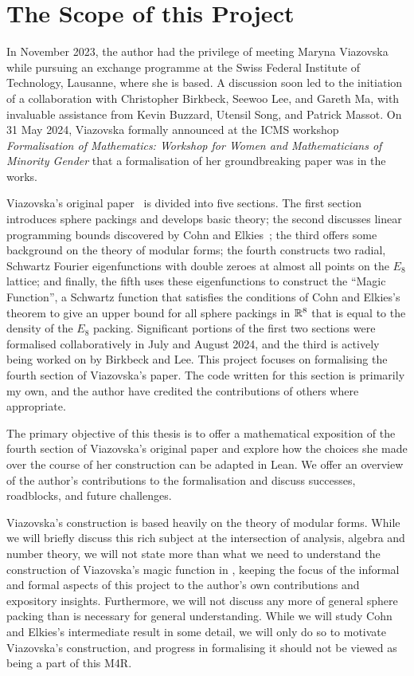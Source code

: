 \section{The Scope of this Project}


In November 2023, the author had the privilege of meeting Maryna Viazovska while pursuing an exchange programme at the Swiss Federal Institute of Technology, Lausanne, where she is based. A discussion soon led to the initiation of a collaboration with Christopher Birkbeck, Seewoo Lee, and Gareth Ma, with invaluable assistance from Kevin Buzzard, Utensil Song, and Patrick Massot. On 31 May 2024, Viazovska formally announced at the ICMS workshop \textit{Formalisation of Mathematics: Workshop for Women and Mathematicians of Minority Gender} that a formalisation of her groundbreaking paper was in the works.

Viazovska's original paper~\cite{Viazovska8} is divided into five sections. The first section introduces sphere packings and develops basic theory; the second discusses linear programming bounds discovered by Cohn and Elkies~\cite[Theorem 3.1]{CohnElkies}; the third offers some background on the theory of modular forms; the fourth constructs two radial, Schwartz Fourier eigenfunctions with double zeroes at almost all points on the $E_8$ lattice; and finally, the fifth uses these eigenfunctions to construct the ``Magic Function'', a Schwartz function that satisfies the conditions of Cohn and Elkies's theorem to give an upper bound for all sphere packings in $\mathbb{R}^8$ that is equal to the density of the $E_8$ packing. Significant portions of the first two sections were formalised collaboratively in July and August 2024, and the third is actively being worked on by Birkbeck and Lee. This project focuses on formalising the fourth section of Viazovska's paper. The code written for this section is primarily my own, and the author have credited the contributions of others where appropriate.

The primary objective of this thesis is to offer a mathematical exposition of the fourth section of Viazovska's original paper and explore how the choices she made over the course of her construction can be adapted in Lean. We offer an overview of the author's contributions to the formalisation and discuss successes, roadblocks, and future challenges.

Viazovska's construction is based heavily on the theory of modular forms. While we will briefly discuss this rich subject at the intersection of analysis, algebra and number theory, we will not state more than what we need to understand the construction of Viazovska's magic function in \cite[\S 4]{Viazovska8}, keeping the focus of the informal and formal aspects of this project to the author's own contributions and expository insights. Furthermore, we will not discuss any more of general sphere packing than is necessary for general understanding. While we will study Cohn and Elkies's intermediate result in some detail, we will only do so to motivate Viazovska's construction, and progress in formalising it should not be viewed as being a part of this M4R.


